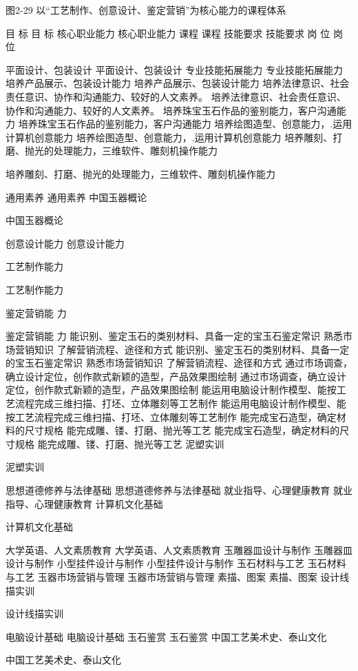 图2-29   以“工艺制作、创意设计、鉴定营销”为核心能力的课程体系

目  标
目  标
核心职业能力
核心职业能力
课程
课程
技能要求
技能要求
岗   位
岗   位

平面设计、包装设计
平面设计、包装设计
专业技能拓展能力
专业技能拓展能力
培养产品展示、包装设计能力
培养产品展示、包装设计能力
培养法律意识、社会责任意识、协作和沟通能力、较好的人文素养。
培养法律意识、社会责任意识、协作和沟通能力、较好的人文素养。
培养珠宝玉石作品的鉴别能力，客户沟通能力
培养珠宝玉石作品的鉴别能力，客户沟通能力
培养绘图造型、创意能力，.运用计算机创意能力
培养绘图造型、创意能力，.运用计算机创意能力
培养雕刻、打磨、抛光的处理能力，三维软件、雕刻机操作能力

培养雕刻、打磨、抛光的处理能力，三维软件、雕刻机操作能力

通用素养
通用素养
中国玉器概论

中国玉器概论

创意设计能力
创意设计能力


工艺制作能力


工艺制作能力

鉴定营销能 力

鉴定营销能 力
能识别、鉴定玉石的类别材料、具备一定的宝玉石鉴定常识
熟悉市场营销知识
了解营销流程、途径和方式
能识别、鉴定玉石的类别材料、具备一定的宝玉石鉴定常识
熟悉市场营销知识
了解营销流程、途径和方式
通过市场调查，确立设计定位，创作款式新颖的造型，产品效果图绘制
通过市场调查，确立设计定位，创作款式新颖的造型，产品效果图绘制
能运用电脑设计制作模型、能按工艺流程完成三维扫描、打坯、立体雕刻等工艺制作
能运用电脑设计制作模型、能按工艺流程完成三维扫描、打坯、立体雕刻等工艺制作
能完成宝石造型，确定材料的尺寸规格
能完成雕、镂、打磨、抛光等工艺
能完成宝石造型，确定材料的尺寸规格
能完成雕、镂、打磨、抛光等工艺
泥塑实训

泥塑实训

思想道德修养与法律基础
思想道德修养与法律基础
就业指导、心理健康教育
就业指导、心理健康教育
计算机文化基础

计算机文化基础

大学英语、人文素质教育
大学英语、人文素质教育
玉雕器皿设计与制作
玉雕器皿设计与制作
小型挂件设计与制作
小型挂件设计与制作
玉石材料与工艺
玉石材料与工艺
玉器市场营销与管理
玉器市场营销与管理
素描、图案
素描、图案
设计线描实训

设计线描实训

电脑设计基础
电脑设计基础
玉石鉴赏
玉石鉴赏
中国工艺美术史、泰山文化


中国工艺美术史、泰山文化


